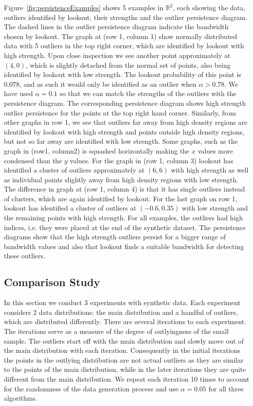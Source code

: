 \documentclass[letter,12pt]{article}
\begin{document}
Figure~\ref{fig:persistenceExamples} shows 5 examples in $\mathbb{R}^2$, each showing the data, outliers identified by lookout, their strengths and the outlier persistence diagram. The dashed lines in the outlier persistence diagram indicate the bandwidth chosen by lookout. The graph at (row 1, column 1) show normally distributed data with 5 outliers in the top right corner, which are identified by lookout with high strength. Upon close inspection we see another point approximately at $(4,0)$, which is slightly detached from the normal set of points, also being identified by  lookout with low strength. The lookout probability of this point is $0.078$, and as such it would only be identified as an outlier when $\alpha > 0.78$.  We have used $\alpha = 0.1$ so that we can match the strengths of the outliers with the persistence diagram. The corresponding persistence diagram shows high strength outlier persistence for the points at the top right hand corner. Similarly, from other graphs in row 1, we see that outliers far away from high density regions are identified by lookout with high strength and points outside high density regions, but not so far away are identified with low strength. Some graphs, such as the graph in (row1, column2) is squashed horizontally making the $x$ values more condensed than the $y$ values. For the graph in (row 1, column 3) lookout has identified a cluster of outliers approximately at $(6,6)$ with high strength as well as individual points slightly away from high density regions with low strength. The difference in graph at (row 1, column 4) is that it has single outliers instead of clusters, which are again identified by lookout. For the last graph on row 1, lookout has identified a cluster of outliers at $(-0.6, 0.35)$ with low strength and the remaining points with high strength.  For all examples, the outliers had high indices, i.e. they were placed at the end of the synthetic dataset. The persistence diagrams show that the high strength outliers persist for a bigger range of bandwidth values and also that lookout finds a suitable bandwidth for detecting these outliers.  


\subsection{Comparison Study}\label{sec:SyntheticComparison}
In this section we conduct 3 experiments with synthetic data. Each experiment considers 2 data distributions; the main distribution and a handful of outliers, which are distributed differently. There are several iterations to each experiment. The iterations serve as a measure of the degree of outlyingness of the small sample. The outliers start off with the main distribution and slowly move out of the main distribution with each iteration. Consequently in the initial iterations the points in the outlying distribution are not actual outliers as they are similar to the points of the main distribution, while in the later iterations they are quite different from the main distribution.  We repeat each iteration 10 times to account for the randomness of the data generation process and use $\alpha = 0.05$ for all three algorithms. 
\end{document}
